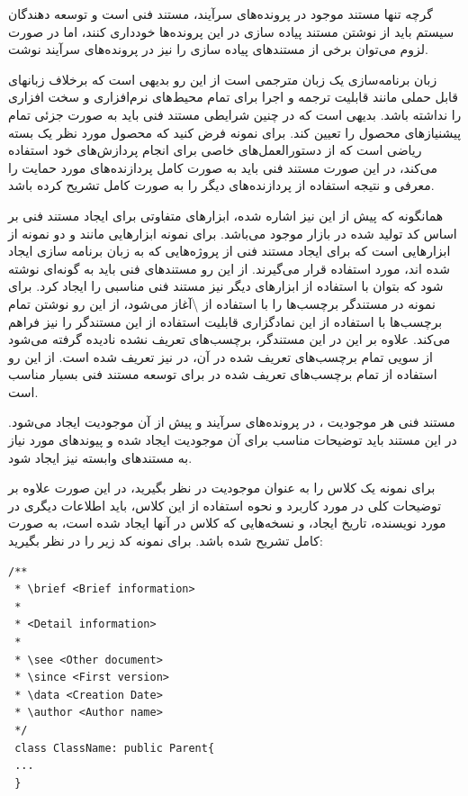 \begin{note}
گرچه تنها مستند موجود در پرونده‌های سرآیند، مستند فنی است و توسعه دهندگان سیستم
باید از نوشتن مستند پیاده سازی در این پرونده‌ها خودداری کنند، اما در صورت لزوم
می‌توان برخی از مستندهای پیاده سازی را نیز در پرونده‌های سرآیند نوشت.
\end{note}

زبان برنامه‌سازی  یک زبان مترجمی است از این رو بدیهی است که برخلاف
زبانهای قابل حملی مانند  قابلیت ترجمه و اجرا برای تمام محیط‌های
نرم‌افزاری و سخت افزاری را نداشته باشد. بدیهی است که در چنین شرایطی مستند فنی
باید به صورت جزئی تمام پیشنیازهای محصول را تعیین کند. برای نمونه فرض کنید که
محصول مورد نظر یک بسته ریاضی است که از دستورالعمل‌های خاصی برای انجام پردازش‌های
خود استفاده می‌کند، در این صورت مستند فنی باید به صورت کامل پردازنده‌های مورد
حمایت را معرفی و نتیجه استفاده از پردازنده‌های دیگر را به صورت کامل تشریح کرده
باشد.

همانگونه که پیش از این نیز اشاره شده، ابزارهای متفاوتی برای ایجاد مستند فنی بر
اساس کد تولید شده در بازار موجود می‌باشد. برای نمونه ابزارهایی مانند 
و  دو نمونه از ابزارهایی است که برای ایجاد مستند فنی از پروژه‌هایی که
به زبان برنامه سازی  ایجاد شده اند، مورد استفاده قرار می‌گیرند. از این
رو مستند‌های فنی باید به گونه‌ای نوشته شود که بتوان با استفاده از ابزارهای دیگر
نیز مستند فنی مناسبی را ایجاد کرد. برای نمونه در مستندگر  برچسب‌ها را
با استفاده از \textbackslash آغاز می‌شود، از این رو نوشتن تمام برچسب‌ها با استفاده
از این نمادگزاری قابلیت استفاده از این مستندگر را نیز فراهم می‌کند.
علاوه بر این در این مستندگر، برچسب‌های تعریف نشده نادیده گرفته می‌شود از سویی
تمام برچسب‌های تعریف شده در آن، در  نیز تعریف شده است. از این رو
استفاده از تمام برچسب‌های تعریف شده در  برای توسعه مستند فنی بسیار
مناسب است.

مستند فنی هر موجودیت ، در پرونده‌های سرآیند و پیش از آن موجودیت ایجاد می‌شود. در
این مستند باید توضیحات مناسب برای آن موجودیت ایجاد شده و پیوندهای مورد نیاز به
مستندهای وابسته نیز ایجاد شود.

برای نمونه یک کلاس را به عنوان موجودیت در نظر بگیرید، در این صورت علاوه بر
توضیحات کلی در مورد کاربرد و نحوه استفاده از این کلاس، باید اطلاعات دیگری در
مورد نویسنده، تاریخ ایجاد، و نسخه‌هایی که کلاس در آنها ایجاد شده است، به صورت
کامل تشریح شده باشد. برای نمونه کد زیر را در نظر بگیرید:

\begin{latin}
\lstset{language=C++}  
\begin{lstlisting}[frame=single] 
/**
 * \brief <Brief information>
 * 
 * <Detail information>
 * 
 * \see <Other document>
 * \since <First version>
 * \data <Creation Date>
 * \author <Author name>
 */
 class ClassName: public Parent{
 ...
 }
\end{lstlisting}
\end{latin}


